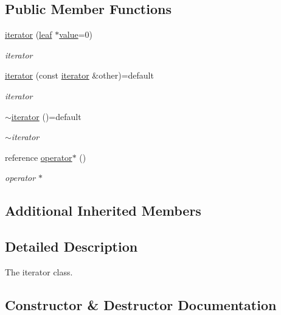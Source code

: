 \subsection*{Public Member Functions}
\begin{DoxyCompactItemize}
\item 
\hyperlink{classformat_1_1leaf_1_1iterator_a94f19614cd58bf64bd15b465780b3007}{iterator} (\hyperlink{classformat_1_1leaf}{leaf} $\ast$\hyperlink{classformat_1_1value_aa6b85823936bf7b8ab78d3f8d443c00d}{value}=0)
\begin{DoxyCompactList}\small\item\em iterator \end{DoxyCompactList}\item 
\hyperlink{classformat_1_1leaf_1_1iterator_aa5942a9e1620a8009fe139e3affaf19f}{iterator} (const \hyperlink{classformat_1_1leaf_1_1iterator}{iterator} \&other)=default
\begin{DoxyCompactList}\small\item\em iterator \end{DoxyCompactList}\item 
\hyperlink{classformat_1_1leaf_1_1iterator_ae22dd7c3629ba7cc5fac7c2b7234d565}{$\sim$iterator} ()=default\hypertarget{classformat_1_1leaf_1_1iterator_ae22dd7c3629ba7cc5fac7c2b7234d565}{}\label{classformat_1_1leaf_1_1iterator_ae22dd7c3629ba7cc5fac7c2b7234d565}

\begin{DoxyCompactList}\small\item\em $\sim$iterator \end{DoxyCompactList}\item 
reference \hyperlink{classformat_1_1leaf_1_1iterator_ac605a437a33d536d4ec68bdf3de32dc8}{operator$\ast$} ()
\begin{DoxyCompactList}\small\item\em operator $\ast$ \end{DoxyCompactList}\end{DoxyCompactItemize}
\subsection*{Additional Inherited Members}


\subsection{Detailed Description}
The iterator class. 

\subsection{Constructor \& Destructor Documentation}
